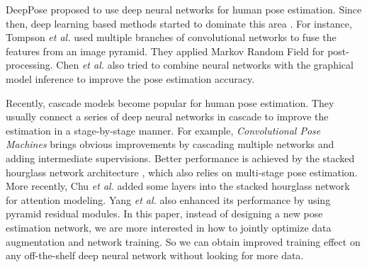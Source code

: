 \documentclass[10pt,twocolumn,letterpaper]{article}
\begin{document}
DeepPose \cite{toshev2014deeppose} proposed to use deep neural networks for human pose estimation. Since then, deep learning based methods started to dominate this area \cite{carreira2016human, tompson2015efficient, hu2016bottom, pishchulin2016deepcut, lifshitz2016human, gkioxari2016chained, insafutdinov2016deepercut, wei2016convolutional, bulat2016human, newell2016stacked}.
For instance, Tompson {\it et al.}\cite{tompson2014joint} used multiple branches of convolutional networks to fuse the features from an image pyramid. They applied Markov Random Field for post-processing. Chen {\it et al.}\cite{chen2014articulated} also tried to combine neural networks with the graphical model inference to improve the pose estimation accuracy. 

Recently, cascade models become popular for human pose estimation. They usually connect a series of deep neural networks in cascade to improve the estimation in a stage-by-stage manner. For example, {\em Convolutional Pose Machines}\cite{wei2016convolutional} brings obvious improvements by cascading multiple networks and adding intermediate supervisions. Better performance is achieved by the stacked hourglass network architecture \cite{newell2016stacked}, which also relies on multi-stage pose estimation. More recently, Chu {\it et al.}\cite{chu2017multi} added some layers into the stacked hourglass network for attention modeling. Yang {\it et al.}\cite{yang2017learning} also enhanced its performance by using pyramid residual modules. In this paper, instead of designing a new pose estimation network, we are more interested in how to jointly optimize data augmentation and network training. So we can obtain improved training effect on any off-the-shelf deep neural network without looking for more data.
\end{document}
